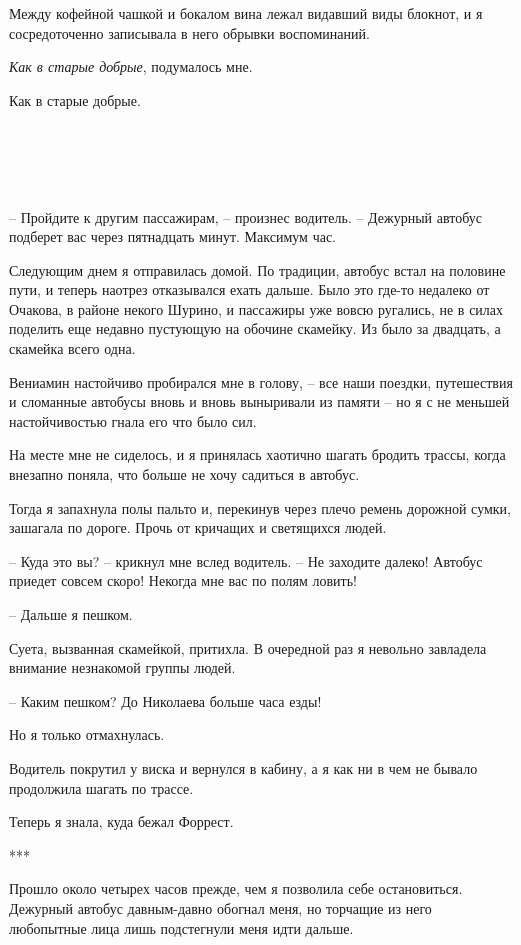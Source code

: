 \documentclass[
]{book}
\begin{document}
Между кофейной чашкой и бокалом вина лежал видавший виды блокнот, и я сосредоточенно записывала в него обрывки воспоминаний.

\emph{Как в старые добрые}, подумалось мне.

Как в старые добрые.

\hypertarget{chapter-98}{%
\chapter{~}\label{chapter-98}}

-- Пройдите к другим пассажирам, -- произнес водитель. -- Дежурный автобус подберет вас через пятнадцать минут. Максимум час.

Следующим днем я отправилась домой. По традиции, автобус встал на половине пути, и теперь наотрез отказывался ехать дальше. Было это где-то недалеко от Очакова, в районе некого Шурино, и пассажиры уже вовсю ругались, не в силах поделить еще недавно пустующую на обочине скамейку. Из было за двадцать, а скамейка всего одна.

Вениамин настойчиво пробирался мне в голову, -- все наши поездки, путешествия и сломанные автобусы вновь и вновь выныривали из памяти -- но я с не меньшей настойчивостью гнала его что было сил.

На месте мне не сиделось, и я принялась хаотично шагать бродить трассы, когда внезапно поняла, что больше не хочу садиться в автобус.

Тогда я запахнула полы пальто и, перекинув через плечо ремень дорожной сумки, зашагала по дороге. Прочь от кричащих и светящихся людей.

-- Куда это вы? -- крикнул мне вслед водитель. -- Не заходите далеко! Автобус приедет совсем скоро! Некогда мне вас по полям ловить!

-- Дальше я пешком.

Суета, вызванная скамейкой, притихла. В очередной раз я невольно завладела внимание незнакомой группы людей.

-- Каким пешком? До Николаева больше часа езды!

Но я только отмахнулась.

Водитель покрутил у виска и вернулся в кабину, а я как ни в чем не бывало продолжила шагать по трассе.

Теперь я знала, куда бежал Форрест.

***

Прошло около четырех часов прежде, чем я позволила себе остановиться. Дежурный автобус давным-давно обогнал меня, но торчащие из него любопытные лица лишь подстегнули меня идти дальше.
\end{document}
